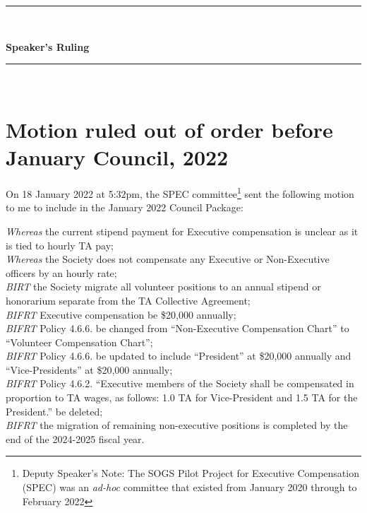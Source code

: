 \begin{center}
	\rule{\textwidth}{3.6pt}\\[\baselineskip] %
	\begin{Huge}
		\textbf{Speaker's Ruling}
	\end{Huge}
	
	\rule{\textwidth}{3.6pt}\\[\baselineskip] %
	
	\vspace*{1\baselineskip} %
\end{center}
\section*{Motion ruled out of order before January Council, 2022}

\noindent On 18 January 2022 at 5:32pm, the SPEC committee\footnote{Deputy Speaker's Note: The SOGS Pilot Project for Executive Compensation (SPEC) was an \emph{ad-hoc} committee that existed from January 2020 through to February 2022} sent the following motion to me to include in the January 2022 Council Package:
\begin{small}
\begin{center}
\noindent\begin{minipage}{0.8\linewidth}
	\emph{Whereas} the current stipend payment for Executive compensation is unclear as it is tied to hourly TA pay; \\
	\emph{Whereas} the Society does not compensate any Executive or Non-Executive officers by an hourly rate; \\
	\emph{BIRT} the Society migrate all volunteer positions to an annual stipend or honorarium separate from the TA Collective Agreement; \\
	\emph{BIFRT} Executive compensation be \$20,000 annually; \\
	\emph{BIFRT} Policy 4.6.6. be changed from ``Non-Executive Compensation Chart'' to ``Volunteer Compensation Chart''; \\
	\emph{BIFRT} Policy 4.6.6. be updated to include ``President'' at \$20,000 annually and ``Vice-Presidents'' at \$20,000 annually; \\
	\emph{BIFRT} Policy 4.6.2. ``Executive members of the Society shall be compensated in proportion to TA wages, as follows: 1.0 TA for Vice-President and 1.5 TA for the President.'' be deleted; \\
	\emph{BIFRT} the migration of remaining non-executive positions is completed by the end of the 2024-2025 fiscal year.
\end{minipage}
\end{center}
\end{small}

